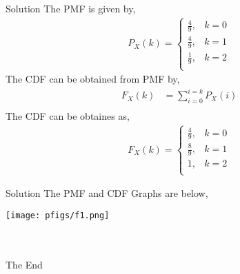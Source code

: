 \documentclass{beamer}
\providecommand{\p}[1]{\ensuremath{{P_X}\left(#1\right)}}
\providecommand{\f}[1]{\ensuremath{{F_X}\left(#1\right)}}
\begin{document}
\begin{frame}{Solution}
	The PMF is given by,
	\begin{align*}
	\p k = 
		\begin{cases}
		\frac{4}{9}, & k = 0\\
		\frac{4}{9}, & k = 1\\
		\frac{1}{9}, & k = 2\\
		\end{cases}		
	\end{align*}
	The CDF can be obtained from PMF by,
	\begin{align*}
	\f k & = \sum_{i = 0}^{i = k}\p i\\
	\end{align*}
	The CDF can be obtaines as,
	\begin{align*}
	\f k = 
		\begin{cases}
			\frac{4}{9}, & k = 0\\
			\frac{8}{9}, & k = 1\\
			1, & k = 2\\			
		\end{cases}
	\end{align*}
\end{frame}

\begin{frame}{Solution}
	The PMF and CDF Graphs are below,
	\begin{center}
		\texttt{[image: pfigs/f1.png]}
	\end{center}
\end{frame}

\begin{frame}
\centering
\ \\ \ \\
\huge The End
\end{frame}
\end{document}
